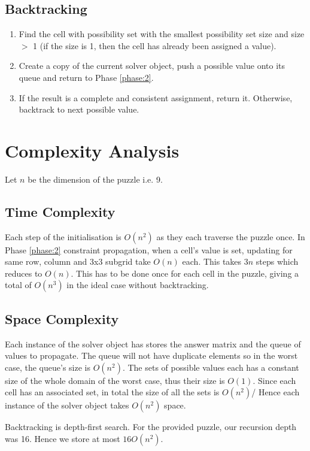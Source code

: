 \documentclass[11pt, a4paper]{article}
\begin{document}
\subsection{Backtracking}
\label{phase:3}
\begin{enumerate}
  \item Find the cell with possibility set with the smallest possibility set size and size $>$ 1 (if the size is 1, then the cell has already been assigned a value).
  \item Create a copy of the current solver object, push a possible value onto its queue and return to Phase \ref{phase:2}.
  \item If the result is a complete and consistent assignment, return it. Otherwise, backtrack to next possible value.
\end{enumerate}

\section{Complexity Analysis}
Let $n$ be the dimension of the puzzle i.e. 9.

\subsection{Time Complexity}
Each step of the initialisation is $O(n^2)$ as they each traverse the puzzle once.
In Phase \ref{phase:2} constraint propagation, when a cell's value is set, updating for same row, column and 3x3 subgrid take $O(n)$ each.
This takes $3n$ steps which reduces to $O(n)$.
This has to be done once for each cell in the puzzle, giving a total of $O(n^3)$ in the ideal case without backtracking.
\subsection{Space Complexity}
Each instance of the solver object has stores the answer matrix and the queue of values to propagate.
The queue will not have duplicate elements so in the worst case, the queue's size is $O(n^2)$.
The sets of possible values each has a constant size of the whole domain of the worst case, thus their size is $O(1)$.
Since each cell has an associated set, in total the size of all the sets is $O(n^2)$/
Hence each instance of the solver object takes $O(n^2)$ space.

Backtracking is depth-first search.
For the provided puzzle, our recursion depth was 16. Hence we store at most $16O(n^2)$.
\end{document}

